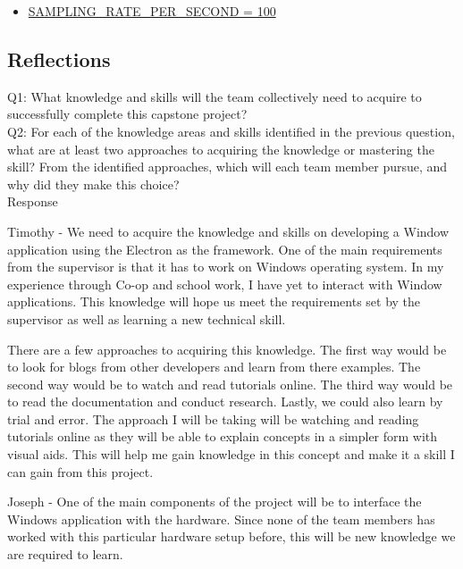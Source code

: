 \documentclass[12pt, titlepage]{article}
\begin{document}
\begin{itemize}
    \color{red}
    \item \hyperref[sec:sampling]{SAMPLING\_RATE\_PER\_SECOND = 100}
\end{itemize}

\subsection{Reflections}

\noindent Q1: What knowledge and skills will the team collectively need to acquire to successfully complete this capstone project? \\
\noindent Q2: For each of the knowledge areas and skills identified in the previous question, what are at least two approaches to acquiring the knowledge or mastering the skill? 
From the identified approaches, which will each team member pursue, and why did they make this choice?\\

\noindent Response


Timothy - We need to acquire the knowledge and skills on developing a Window application using the Electron as the framework. One of the main requirements
from the supervisor is that it has to work on Windows operating system. In my experience through Co-op and school work, I have 
yet to interact with Window applications. This knowledge will hope us meet the requirements set by the supervisor as well 
as learning a new technical skill. 

There are a few approaches to acquiring this knowledge. The first way would be to look for blogs from other developers and learn from there
examples. The second way would be to watch and read tutorials online. The third way would be to read the documentation and conduct research. Lastly, 
we could also learn by trial and error. The approach I will be taking will be watching and reading tutorials online as they will be able to explain 
concepts in a simpler form with visual aids. This will help me gain knowledge in this concept and 
make it a skill I can gain from this project.

Joseph - One of the main components of the project will be to interface the Windows application with the hardware. Since none of the team members has worked with this particular hardware setup before, this will be new knowledge we are required to learn.  
\end{document}
